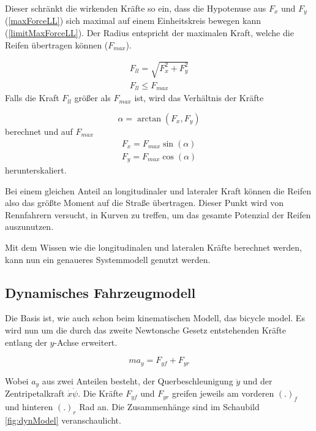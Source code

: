 \documentclass{like}
\begin{document}
Dieser schränkt die wirkenden Kräfte so ein, dass die Hypotenuse aus \(F_x\) und \(F_y\) (\ref{maxForceLL}) sich maximal auf einem Einheitskreis bewegen kann (\ref{limitMaxForceLL}). Der Radius entspricht der maximalen Kraft, welche die Reifen übertragen können (\(F_{max}\)).

\begin{eqnarray}
F_{ll} = \sqrt{F_x^2 + F_y^2} \label{maxForceLL} \\
F_{ll} \leq F_{max}  \label{limitMaxForceLL}
\end{eqnarray}
Falls die Kraft $F_{ll}$ größer als $F_{max}$ ist, wird das Verhältnis der Kräfte 

\begin{equation}
	\alpha = \arctan(F_x, F_y)
\end{equation}
berechnet und auf $F_{max}$ 
\begin{eqnarray}
F_x = F_{max} \sin(\alpha)\\
F_y = F_{max} \cos(\alpha)
\end{eqnarray}
herunterskaliert.


Bei einem gleichen Anteil an longitudinaler und lateraler Kraft können die Reifen also das größte Moment auf die Straße übertragen. Dieser Punkt wird von Rennfahrern versucht, in Kurven zu treffen, um das gesamte Potenzial der Reifen auszunutzen.

Mit dem Wissen wie die longitudinalen und lateralen Kräfte berechnet werden, kann nun ein genaueres Systemmodell genutzt werden.

\subsection{Dynamisches Fahrzeugmodell}
\label{dynModel}

Die Basis ist, wie auch schon beim kinematischen Modell, das bicycle model. Es wird nun um die durch das zweite Newtonsche Gesetz entstehenden Kräfte entlang der \(y\)-Achse erweitert.

\begin{equation}
ma_y = F_{yf} + F_{yr}
\end{equation}   


Wobei \(a_y\) aus zwei Anteilen besteht, der Querbeschleunigung \(\ddot{y}\) und der Zentripetalkraft \(\dot{x} \dot{\psi}\).  
Die Kräfte \(F_{yf}\) und \(F_{yr}\) greifen jeweils am vorderen \((.)_f\) und hinteren \((.)_r\) Rad an. Die Zusammenhänge sind im Schaubild \ref{fig:dynModel} veranschaulicht. 
\end{document}
